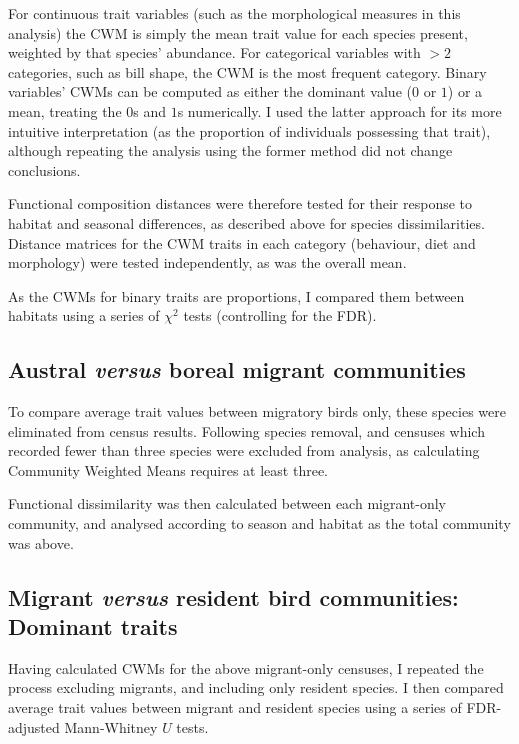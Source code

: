 \documentclass[12pt,a4paper]{book}
\begin{document}
For continuous trait variables (such as the morphological measures in this analysis) the CWM is simply the mean trait value for each species present, weighted by that species' abundance. For categorical variables with $>2$ categories, such as bill shape, the CWM is the most frequent category. Binary variables' CWMs can be computed as either the dominant value ($0$ or $1$) or a mean, treating the $0$s and $1$s numerically. I used the latter approach for its more intuitive interpretation (as the proportion of individuals possessing that trait), although repeating the analysis using the former method did not change conclusions.

Functional composition distances were therefore tested for their response to habitat and seasonal differences, as described above for species dissimilarities. Distance matrices for the CWM traits in each category (behaviour, diet and morphology) were tested independently, as was the overall mean.

As the CWMs for binary traits are proportions, I compared them between habitats using a series of $\chi^2$ tests (controlling for the FDR). 

\subsection{Austral \emph{versus} boreal migrant communities}

To compare average trait values between migratory birds only, these species were eliminated from census results. Following species removal, and censuses which recorded fewer than three species were excluded from analysis, as calculating Community Weighted Means requires at least three.

Functional dissimilarity was then calculated between each migrant-only community, and analysed according to season and habitat as the total community was above.

\subsection{Migrant \emph{versus} resident bird communities: Dominant traits}

Having calculated CWMs for the above migrant-only censuses, I repeated the process excluding migrants, and including only resident species. I then compared average trait values between migrant and resident species using a series of FDR-adjusted Mann-Whitney $U$ tests. 
\end{document}

